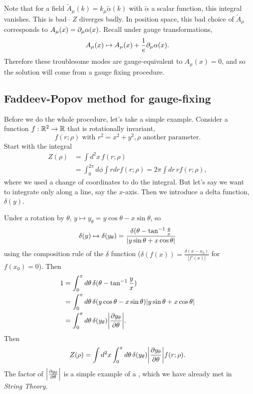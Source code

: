 Note that for a field $\tilde A_\mu(k)=k_\mu \tilde \alpha(k)$ with $\tilde \alpha$ a scalar function, this integral vanishes. This is bad-- $Z$ diverges badly. In position space, this bad choice of $\tilde A_\mu$ corresponds to $A_\mu(x)=\p_\mu\alpha(x)$.
Recall under gauge transformations,
\begin{equation}
    A_\mu(x)\mapsto A_\mu(x) +\frac{1}{e} \p_\mu \alpha(x).
\end{equation}
Therefore these troublesome modes are gauge-equivalent to $A_\mu(x)=0$, and so the solution will come from a gauge fixing procedure.

\subsection*{Faddeev-Popov method for gauge-fixing} Before we do the whole procedure, let's take a simple example. Consider a function $f:\RR^2\to \RR$ that is rotationally invariant,
\begin{equation}
    f(r;\rho)\text{ with }r^2=x^2+y^2,\rho\text{ another parameter}.
\end{equation}
Start with the integral
\begin{align*}
    Z(\rho)&=\int d^2x\, f(r;\rho)\\
        &= \int_0^{2\pi} d\phi \int rdr f(r;\rho) =2\pi \int dr\, r f(r;\rho),
\end{align*}
where we used a change of coordinates to do the integral. But let's say we want to integrate only along a line, say the $x$-axis. Then we introduce a delta function, $\delta(y)$.

Under a rotation by $\theta$, $y\mapsto y_\theta = y\cos\theta -x\sin\theta$, so
\begin{equation}
    \delta(y) \mapsto \delta(y_\theta) = \frac{\delta(\theta-\tan^{-1}\frac{y}{x}}{\abs{y\sin\theta +x\cos\theta}}
\end{equation}
using the composition rule of the $\delta$ function ($\delta(f(x))=\frac{\delta(x-x_0)}{|f'(x)|}$ for $f(x_0)=0$).
Then
\begin{align*}
    1 &= \int_0^\pi d\theta\, \delta(\theta-\tan^{-1}\frac{y}{x})\\
        &= \int_0^\pi d\theta \, \delta(y\cos\theta-x\sin\theta)\abs{y\sin\theta +x\cos\theta}\\
        &= \int_0^\pi d\theta\, \delta(y_\theta) \abs*{\P{y_\theta}{\theta}}.
\end{align*}
Then
\begin{equation}
    Z(\rho)=\int d^2x \int_0^\pi d\theta\, \delta(y_\theta) \abs*{\P{y_\theta}{\theta}} f(r;\rho).
\end{equation}
The factor of $\abs*{\P{y_\theta}{\theta}}$ is a simple example of a , which we have already met in \emph{String Theory}.

